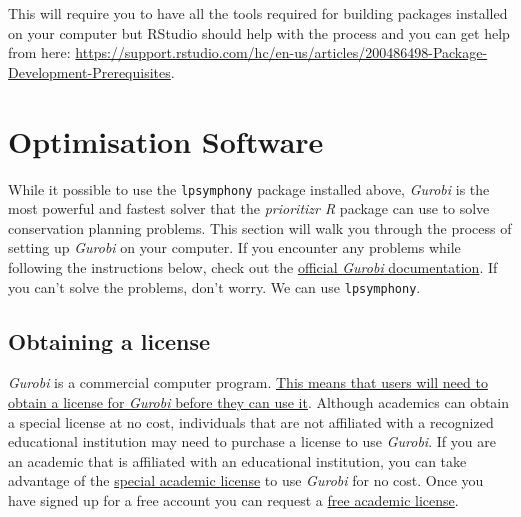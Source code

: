 \documentclass[
  12pt,
]{book}
\begin{document}
This will require you to have all the tools required for building packages installed on your computer but RStudio should help with the process and you can get help from here: \url{https://support.rstudio.com/hc/en-us/articles/200486498-Package-Development-Prerequisites}.

\hypertarget{optimisation-software}{%
\section{Optimisation Software}\label{optimisation-software}}

While it possible to use the \texttt{lpsymphony} package installed above, \emph{Gurobi} is the most powerful and fastest solver that the \emph{prioritizr R} package can use to solve conservation planning problems. This section will walk you through the process of setting up \emph{Gurobi} on your computer. If you encounter any problems while following the instructions below, check out the \href{https://www.gurobi.com/documentation/}{official \emph{Gurobi} documentation}. If you can't solve the problems, don't worry. We can use \texttt{lpsymphony}.

\hypertarget{obtaining-a-license}{%
\subsection{Obtaining a license}\label{obtaining-a-license}}

\emph{Gurobi} is a commercial computer program. \href{https://www.gurobi.com/products/licensing-pricing/licensing-overview}{This means that users will need to obtain a license for \emph{Gurobi} before they can use it}. Although academics can obtain a special license at no cost, individuals that are not affiliated with a recognized educational institution may need to purchase a license to use \emph{Gurobi}. If you are an academic that is affiliated with an educational institution, you can take advantage of the \href{https://www.gurobi.com/downloads/end-user-license-agreement-academic/}{special academic license} to use \emph{Gurobi} for no cost. Once you have signed up for a free account you can request a \href{https://www.gurobi.com/downloads/end-user-license-agreement-academic/}{free academic license}.
\end{document}
